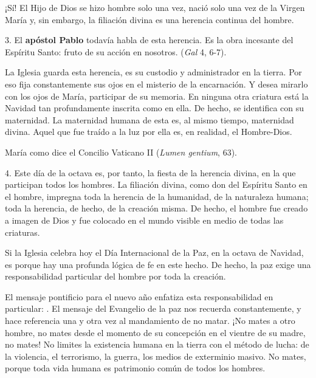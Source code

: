 \begin{body}
	¡Sí! El Hijo de Dios se hizo hombre solo una vez, nació solo una vez de la Virgen María y, sin embargo, la filiación divina es una herencia continua del hombre.
	
	3. El \textbf{apóstol Pablo} todavía habla de esta herencia. Es la obra incesante del Espíritu Santo: fruto de su acción en nosotros.  (\emph{Gal} 4, 6-7).
	
	La Iglesia guarda esta herencia, es su custodio y administrador en la tierra. Por eso fija constantemente sus ojos en el misterio de la encarnación. Y desea mirarlo con los ojos de María, participar de su memoria. En ninguna otra criatura está la Navidad tan profundamente inscrita como en ella. De hecho, se identifica con su maternidad. La maternidad humana de esta  es, al mismo tiempo, maternidad divina. Aquel que fue traído a la luz por ella es, en realidad, el Hombre-Dios.
	
	María como dice el Concilio Vaticano II  (\emph{Lumen gentium}, 63).
	
	4. Este día de la octava es, por tanto, la fiesta de la herencia divina, en la que participan todos los hombres. La filiación divina, como don del Espíritu Santo en el hombre, impregna toda la herencia de la humanidad, de la naturaleza humana; toda la herencia, de hecho, de la creación misma. De hecho, el hombre fue creado a imagen de Dios y fue colocado en el mundo visible en medio de todas las criaturas.
	
	Si la Iglesia celebra hoy el Día Internacional de la Paz, en la octava de Navidad, es porque hay una profunda lógica de fe en este hecho. De hecho, la paz exige una responsabilidad particular del hombre por toda la creación.
	
	El mensaje pontificio para el nuevo año enfatiza esta responsabilidad en particular: . El mensaje del Evangelio de la paz nos recuerda constantemente, y hace referencia una y otra vez al mandamiento de no matar. ¡No mates a otro hombre, no mates desde el momento de su concepción en el vientre de su madre, no mates! No limites la existencia humana en la tierra con el método de lucha: de la violencia, el terrorismo, la guerra, los medios de exterminio masivo. No mates, porque toda vida humana es patrimonio común de todos los hombres.
	

\end{body}
